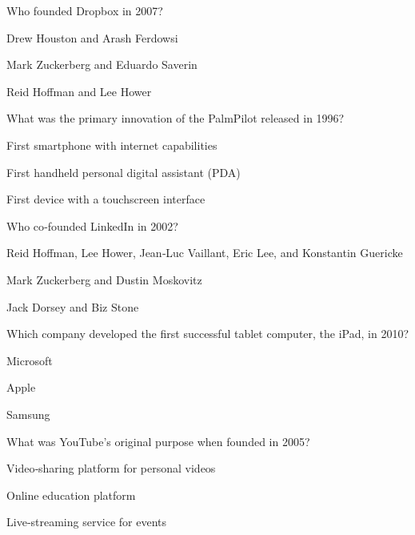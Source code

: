 \begin{enhancedmcq}{Who founded Dropbox in 2007?}
\item Drew Houston and Arash Ferdowsi
\item Mark Zuckerberg and Eduardo Saverin
\item Reid Hoffman and Lee Hower

\end{enhancedmcq}
\begin{enhancedmcq}{What was the primary innovation of the PalmPilot released in 1996?}
\item First smartphone with internet capabilities
\item First handheld personal digital assistant (PDA)
\item First device with a touchscreen interface

\end{enhancedmcq}
\begin{enhancedmcq}{Who co‑founded LinkedIn in 2002?}
\item Reid Hoffman, Lee Hower, Jean‑Luc Vaillant, Eric Lee, and Konstantin Guericke
\item Mark Zuckerberg and Dustin Moskovitz
\item Jack Dorsey and Biz Stone

\end{enhancedmcq}
\begin{enhancedmcq}{Which company developed the first successful tablet computer, the iPad, in 2010?}
\item Microsoft
\item Apple
\item Samsung

\end{enhancedmcq}
\begin{enhancedmcq}{What was YouTube's original purpose when founded in 2005?}
\item Video‑sharing platform for personal videos
\item Online education platform
\item Live‑streaming service for events

\end{enhancedmcq}
